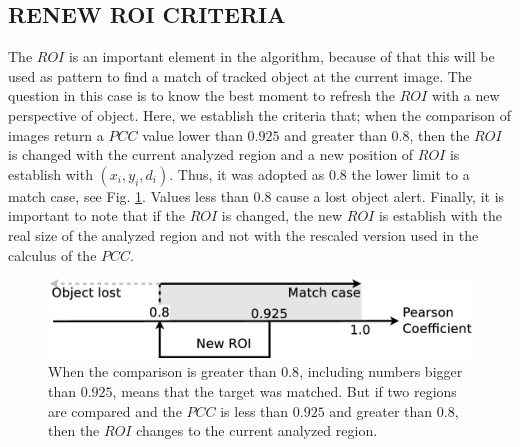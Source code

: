 \subsection{RENEW ROI CRITERIA}
The $ROI$ is an important element in the algorithm, because of that this  
will be used as pattern to find a match of tracked object at the current image. 
The  question in this case is to know the best moment to refresh the $ROI$
with a new perspective of object. 
Here, we establish the criteria that; when the comparison of images return 
a $PCC$ value lower than $0.925$ and greater than $0.8$, then the $ROI$ is changed with the current 
analyzed region and a new position of $ROI$ is establish with $(x_i,y_i,d_i)$. 
Thus, it was adopted as $0.8$ the lower limit to a match case\cite{Eugene},
see Fig. \ref{fig:newroicri}. Values less than $0.8$ cause a  lost object alert.
Finally, it is important to note that if the $ROI$ is changed, the new $ROI$ is establish
with the real size of the analyzed region and not with the rescaled version used
in the calculus of the $PCC$.


\begin{figure}[H]
\includegraphics[width=\columnwidth]{images/figure3.eps}
\caption{When the comparison is greater than $0.8$, including numbers bigger than 
$0.925$, means that the target was matched. But if two regions are compared 
and the $PCC$ is less than $0.925$ and greater than $0.8$, 
then the $ROI$ changes to the current analyzed region.}
\label{fig:newroicri}
\end{figure}

